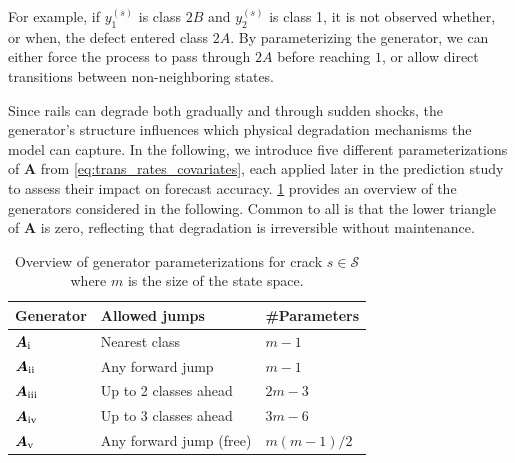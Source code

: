 \documentclass{article}
\newcommand{\RN}[1]{\textup{\uppercase\expandafter{\romannumeral#1}}}
\begin{document}
For example, if $y_1^{(s)}$ is class $2B$ and $y_2^{(s)}$ is class 1, it is not observed whether, or when, the defect entered class $2A$. By parameterizing the generator, we can either force the process to pass through $2A$ before reaching $1$, or allow direct transitions between non-neighboring states. 

Since rails can degrade both gradually and through sudden shocks, the generator’s structure influences which physical degradation mechanisms the model can capture. In the following, we introduce five different parameterizations of $\bm{A}$ from \cref{eq:trans_rates_covariates}, each applied later in the prediction study to assess their impact on forecast accuracy. \cref{tab:generators_overview} provides an overview of the generators considered in the following. Common to all is that the lower triangle of $\bm{A}$ is zero, reflecting that degradation is irreversible without maintenance.

\begin{table}[htb!]
\centering
\caption{Overview of generator parameterizations for crack $s \in \mathcal{S}$ where $m$ is the size of the state space.}
\label{tab:generators_overview}
\begin{tabular}{@{}lll@{}}
\toprule
Generator & Allowed jumps & \#Parameters \\\midrule
$\bm{A}_{\RN{1}}$ & Nearest class & $m - 1$ \\$\bm{A}_{\RN{2}}$ & Any forward jump & $m - 1$ \\$\bm{A}_{\RN{3}}$ & Up to 2 classes ahead & $2m - 3$ \\$\bm{A}_{\RN{4}}$ & Up to 3 classes ahead & $3m - 6$ \\$\bm{A}_{\RN{5}}$ & Any forward jump (free) & $m(m-1)/2$ \\\bottomrule
\end{tabular}
\end{table}
\end{document}
